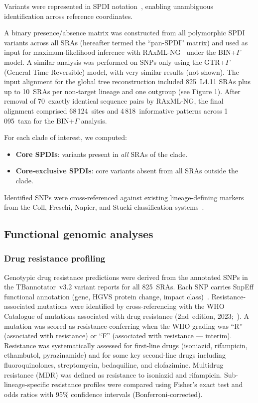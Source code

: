 \documentclass[11pt,a4paper]{article}
\newcommand{\lignee}[1]{\textsf{#1}}
\begin{document}
Variants were represented in SPDI notation~\cite{holmes2020},
enabling unambiguous identification across reference coordinates.

A binary presence/absence matrix was constructed from all polymorphic
SPDI variants across all SRAs (hereafter termed the ``pan-SPDI'' matrix)
and used as input
for maximum-likelihood inference with RAxML-NG~\cite{kozlov2019} under the
BIN+$\Gamma$ model. A similar analysis was performed on SNPs only using the GTR+$\Gamma$ (General Time Reversible) model, with very similar results (not shown).  The input alignment for the global tree reconstruction included 825~\lignee{L4.11}
SRAs plus up to 10~SRAs per non-target lineage and one outgroup (see Figure 1).
After removal of 70~exactly identical sequence pairs by RAxML-NG, the final
alignment comprised 68\,124~sites and 4\,818~informative patterns across
1\,095~taxa for the BIN+$\Gamma$ analysis.

For each clade of interest, we computed:
\begin{itemize}
	\item \textbf{Core SPDIs}: variants present in \emph{all} SRAs of the clade.
	\item \textbf{Core-exclusive SPDIs}: core variants absent from all SRAs
	      outside the clade.
\end{itemize}

Identified SNPs were cross-referenced against existing lineage-defining
markers from the Coll, Freschi, Napier, and Stucki classification systems~\cite{coll2014,freschi2021,napier2020,stucki2016}.

\subsection{Functional genomic analyses}

\subsubsection{Drug resistance profiling}
\label{sec:dr_profiling}

Genotypic drug resistance predictions were derived from the annotated
SNPs in the TBannotator~v3.2 variant reports for all 825~SRAs.
Each SNP carries SnpEff functional annotation (gene, HGVS protein
change, impact class)~\cite{cingolani2012}.  Resistance-associated mutations were identified
by cross-referencing with the WHO Catalogue of mutations associated
with drug resistance (2nd~edition, 2023;~\cite{who2023catalogue}).
A mutation was scored as resistance-conferring when the WHO grading
was ``R'' (associated with resistance) or ``F'' (associated with resistance ---
interim).  Resistance was systematically assessed for first-line drugs (isoniazid,
rifampicin, ethambutol, pyrazinamide) and for some key second-line drugs
including fluoroquinolones, streptomycin, bedaquiline, and clofazimine.
Multidrug resistance (MDR) was defined as resistance to
isoniazid and rifampicin.  Sub-lineage-specific resistance profiles
were compared using Fisher's exact test and odds ratios with 95\%
confidence intervals (Bonferroni-corrected).
\end{document}
